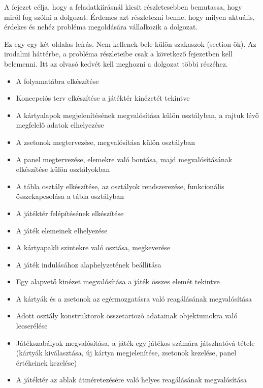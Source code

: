 
A fejezet célja, hogy a feladatkiírásnál kicsit részletesebben bemutassa, hogy miről fog szólni a dolgozat.
Érdemes azt részletezni benne, hogy milyen aktuális, érdekes és nehéz probléma megoldására vállalkozik a dolgozat.

Ez egy egy-két oldalas leírás.
Nem kellenek bele külön szakaszok (section-ök).
Az irodalmi háttérbe, a probléma részleteibe csak a következő fejezetben kell belemenni.
Itt az olvasó kedvét kell meghozni a dolgozat többi részéhez.

\vspace{25mm}


\begin{itemize}
\item A folyamatábra elkészítése
\item Koncepciós terv elkészítése a játéktér kinézetét tekintve
\item A kártyalapok megjelenítésének megvalósítása külön osztályban, a rajtuk lévő megfelelő adatok elhelyezése
\item A zsetonok megtervezése, megvalósítása külön osztályban
\item A panel megtervezése, elemekre való bontása, majd megvalósításának elkészítése külön osztályokban
\item A tábla osztály elkészítése, az osztályok rendszerezése, funkcionális összekapcsolása a tábla osztályban
\item A játéktér felépítésének elkészítése
\item A játék elemeinek elhelyezése
\item A kártyapakli szintekre való osztása, megkeverése
\item A játék indulásához alaphelyzetének beállítása
\item Egy alapvető kinézet megvalósítása a játék összes elemét tekintve
\item A kártyák és a zsetonok az egérmozgatásra való reagálásának megvalósítása
\item Adott osztály konstruktorok összetartozó adatainak objektumokra való lecserélése
\item Játékszabályok megvalósítása, a játék egy játékos számára játszhatóvá tétele (kártyák kiválasztása, új kártya megjelenítése, zsetonok kezelése, panel értékeinek kezelése)
\item A játéktér az ablak átméretezésére való helyes reagálásának megvalósítása
\end{itemize}